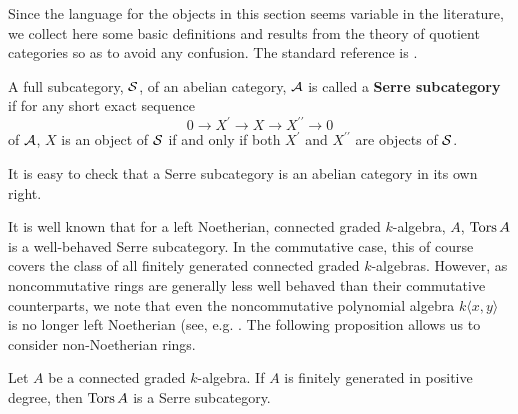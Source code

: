 Since the language for the objects in this section seems variable in the literature, we collect here some basic definitions and results from the theory of quotient categories so as to avoid any confusion.
The standard reference is \parencite{DCA62}.

\begin{definition}
  A full subcategory, \(\mathcal{S}\), of an abelian category, \(\mathcal{A}\) is called a \textbf{Serre subcategory} if for any short exact sequence
  \[0 \to X^\prime \to X \to X^{\prime\prime} \to 0\]
  of \(\mathcal{A}\), \(X\) is an object of \(\mathcal{S}\) if and only if both \(X^\prime\) and \(X^{\prime\prime}\) are objects of \(\mathcal{S}\).
\end{definition}

\begin{remark}
  It is easy to check that a Serre subcategory is an abelian category in its own right.
\end{remark}

It is well known that for a left Noetherian, connected graded \(k\)-algebra, \(A\), \(\operatorname{Tors}A\) is a well-behaved Serre subcategory.
In the commutative case, this of course covers the class of all finitely generated connected graded \(k\)-algebras.
However, as noncommutative rings are generally less well behaved than their commutative counterparts, we note that even the noncommutative polynomial algebra \(k\langle x,y\rangle\) is no longer left Noetherian (see, e.g. \parencite[Exercise 1, p. 8]{Goodearl}.
The following proposition allows us to consider non-Noetherian rings.

\begin{proposition}\label{proposition: f.g. torsion}
  Let \(A\) be a connected graded \(k\)-algebra.
  If \(A\) is finitely generated in positive degree, then \(\operatorname{Tors}A\) is a Serre subcategory.
\end{proposition}

